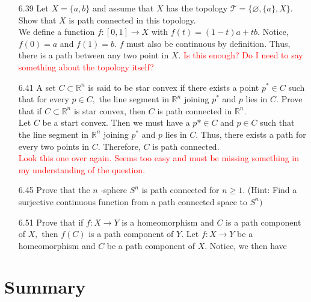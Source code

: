 \documentclass[12pt]{article}
\newcommand{\R}{\mathbb{R}}
\begin{document}
\begin{enumerate}
		\item[6.39] Let $X = \{ a , b \}$ and assume that $X$ has the topology $\mathcal { T } = \{ \varnothing , \{ a \} , X \} .$ Show that $X$ is path connected in this topology.\\
		We define a function $ f:[0,1]\rightarrow X $ with $ f(t)=(1-t)a+tb $. Notice, $ f(0)=a $ and $ f(1)=b $. $ f $ must also be continuous by definition. Thus, there is a path between any two point in $ X $.
		\textcolor{red}{Is this enough? Do I need to say something about the topology itself?}
		
		\item[6.41] A set $C \subset \mathbb { R } ^ { n }$ is said to be star convex if there exists a point $p ^ { * } \in C$ such that
		for every $p \in C ,$ the line segment in $\mathbb { R } ^ { n }$ joining $p ^ { * }$ and $p$ lies in $C .$ Prove that
		if $C \subset \mathbb { R } ^ { n }$ is star convex, then $C$ is path connected in $\mathbb { R } ^ { n } .$\\
		Let $ C $ be a start convex. Then we must have a $ p*\in C $ and $ p\in C $ such that the line segment in $ \R^n $ joining $ p^* $ and $ p $ lies in $ C $. Thus, there exists a path for every two points in $ C $. Therefore, $ C $ is path connected.\\
		\textcolor{red}{Look this one over again. Seems too easy and must be missing something in my understanding of the question.}
		
		\item[6.45] Prove that the $n$ -sphere $S ^ { n }$ is path connected for $n \geq 1 .$ (Hint: Find a surjective continuous function from a path connected space to $S ^ { n })$ 
		
		\item[6.51] Prove that if $f : X \rightarrow Y$ is a homeomorphism and $C$ is a path component of $X ,$ then $f ( C )$ is a path component of $Y .$
			Let $ f:X\rightarrow Y $ be a homeomorphism and $ C $ be a path component of $ X $. Notice, we then have
	\end{enumerate}
	\section*{Summary}
	
\end{document}
